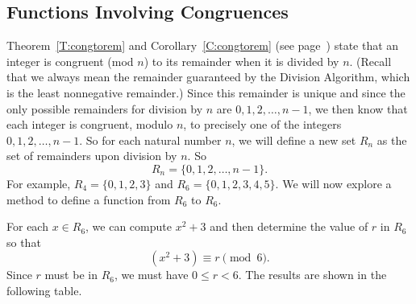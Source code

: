 

\subsection*{Functions Involving Congruences} \label{sub:functioncong}
Theorem~\ref{T:congtorem} and Corollary~\ref{C:congtorem} (see page~\pageref{T:congtorem}) state that an integer is congruent (mod $n$) to its remainder when it is divided by  $n$.  (Recall that we always mean the remainder guaranteed by the Division Algorithm, which is the least nonnegative remainder.)  Since this remainder is unique and since the only possible remainders for division by $n$  are  $0, 1, 2,  \ldots , n - 1$, we then know that each integer is congruent, modulo $n$, to precisely one of the integers $0,1,2, \ldots ,n - 1$.  So for each natural number 
$n$, we will define a new set $R_n$ as the set of remainders upon division by $n$.  So \label{page:R_n}
\[
R_n = \{ 0, 1, 2, \ldots , n - 1 \}.
\]
For example, $R_4 = \{0, 1, 2, 3 \}$ and $R_6 = \{ 0, 1, 2, 3, 4, 5 \}$.  We will now explore a method to define a function from $R_6$ to $R_6$.

For each  $x \in R_6 $, we can compute $x^2  + 3$ and then determine the value of  $r$  in  
$R_6 $ so that
\[
\left( {x^2  + 3} \right) \equiv r\pmod 6.
\]
Since $r$ must be in $R_6$, we must have $0 \leq r < 6$.  The results are shown in the following table.

